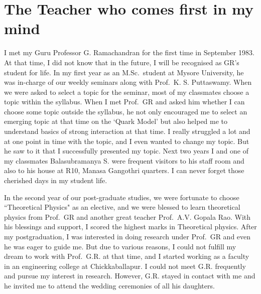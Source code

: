 \chapter{The Teacher who comes first in my mind}\label{chap33}



I met my Guru Professor G. Ramachandran for the first time in September 1983. At that time, I did not know that in the future, I will be recognised as GR's student for life. In my first year as an M.Sc.\ student at Mysore University, he was in-charge of our weekly seminars along with Prof.\ K. S. Puttaswamy. When we were asked to select a topic for the seminar, most of my classmates choose a topic within the syllabus. When I met Prof.\ GR and asked him whether I can choose some topic outside the syllabus, he not only encouraged me to select an emerging topic at that time on the `Quark Model' but also helped me to understand basics of strong interaction at that time. I really struggled a lot and at one point in time with the topic, and I even wanted to change my topic. But he saw to it that I successfully presented my topic. Next two years I and one of my classmates Balasubramanya S. were frequent visitors to his staff room and also to his house at R10, Manasa Gangothri quarters. I can never forget those cherished days in my student life. 

In the second year of our post-graduate studies, we were fortunate to choose ``Theoretical Physics" as an elective, and we were blessed to learn theoretical physics from Prof.\ GR and another great teacher Prof.\ A.V. Gopala Rao. With his blessings and support, I scored the highest marks in Theoretical physics. After my postgraduation, I was interested in doing research under Prof.\ GR and even he was eager to guide me. But due to various reasons, I could not fulfill my dream to work with Prof.\ G.R. at that time, and I started working as a faculty in an engineering college at Chickkaballapur. I could not meet G.R. frequently and pursue my interest in research. However, G.R. stayed in contact with me and he invited me to attend the wedding ceremonies of all his daughters. 

